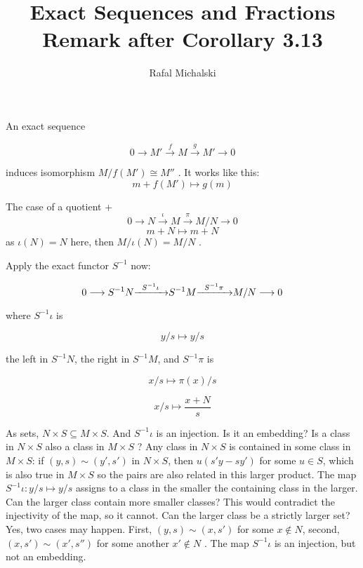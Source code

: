 \documentclass{article}
\title{Exact Sequences and Fractions \\ Remark after Corollary 3.13}
\author{Rafal Michalski}
\date{}
\begin{document}
 

\maketitle

An exact sequence

\[
0 \longrightarrow M' \overset{f}{\longrightarrow} M \overset{g}{\longrightarrow} M' \longrightarrow 0
\]

\noindent
induces isomorphism $M/f(M') \cong M''$ . It works like this:
\[
m + f(M') \mapsto g(m)
\]

\noindent
The case of a quotient
+
\[
0 \longrightarrow N \overset{\iota}{\longrightarrow} M \overset{\pi}{\longrightarrow} M/N \longrightarrow 0
\]
\[
m + N \mapsto m + N
\]
\noindent
as $\iota(N) = N$ here, then $M / \iota(N) = M/N$ .

\vspace{2mm}

Apply the exact functor $S^{-1}$ now:

\[
0  \longrightarrow S^{-1}N {\xrightarrow{\hspace{2mm}S^{-1}\iota\hspace{2mm}}} S^{-1}M {\xrightarrow{\hspace{2mm}S^{-1}\pi\hspace{2mm}}} M/N \longrightarrow 0
\]

\noindent
where $S^{-1}\iota$ is

\[
y/s \mapsto  y/s
\]

\noindent
the left in $S^{-1}N$, the right in $S^{-1}M$, and $S^{-1}\pi$ is

\[
x/s \mapsto \pi(x)/s 
\]

\[
x/s \mapsto \frac{x + N}{s}
\]

As sets, $N \times S \subseteq M \times S$. And $S^{-1}\iota$ is an injection. Is it an embedding? Is a class in $N \times S$ also a class in $M \times S$ ? Any class in $N \times S$ is contained in some class in $M \times S$: if $(y, s) \sim (y', s')$ in $N \times S$, then $u(s'y - sy')$ for some $u \in S$, which is also true in $M \times S$ so the pairs are also related in this larger product. The map $S^{-1}\iota: y/s \mapsto y/s$ assigns to a class in the smaller the containing class in the larger. Can the larger class contain more smaller classes? This would contradict the injectivity of the map, so it cannot. Can the larger class be a strictly larger set? Yes, two cases may happen. First, $(y, s) \sim (x, s')$ for some $x \notin N$, second, $(x, s') \sim (x', s'')$ for some another $x' \notin N$ . The map $S^{-1}\iota$ is an injection, but not an embedding.
\end{document}
